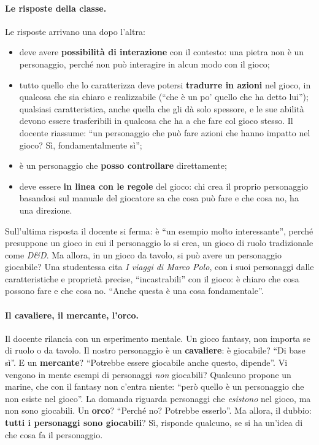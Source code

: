 \paragraph{Le risposte della classe.} Le risposte arrivano una dopo l'altra:
\begin{itemize}
  \item deve avere \textbf{possibilità di interazione} con il contesto: una pietra
        non è un personaggio, perché non può interagire in alcun modo con il
        gioco;
  \item tutto quello che lo caratterizza deve potersi \textbf{tradurre in azioni}
        nel gioco, in qualcosa che sia chiaro e realizzabile (``che è un po' quello
        che ha detto lui''); qualsiasi caratteristica, anche quella che gli dà
        solo spessore, e le sue abilità devono essere trasferibili in qualcosa che
        ha a che fare col gioco stesso. Il docente riassume: ``un personaggio che
        può fare azioni che hanno impatto nel gioco? Sì, fondamentalmente sì'';
  \item è un personaggio che \textbf{posso controllare} direttamente;
  \item deve essere \textbf{in linea con le regole} del gioco: chi crea il proprio
        personaggio basandosi sul manuale del giocatore sa che cosa può fare e che
        cosa no, ha una direzione.
\end{itemize}
Sull'ultima risposta il docente si ferma: è ``un esempio molto interessante'',
perché presuppone un gioco in cui il personaggio lo si crea, un gioco di ruolo
tradizionale come \emph{D\&D}. Ma allora, in un gioco da tavolo, si può avere un
personaggio giocabile? Una studentessa cita \emph{I viaggi di Marco Polo}, con i
suoi personaggi dalle caratteristiche e proprietà precise, ``incastrabili'' con il
gioco: è chiaro che cosa possono fare e che cosa no. ``Anche questa è una cosa
fondamentale''.

\paragraph{Il cavaliere, il mercante, l'orco.} Il docente rilancia con un
esperimento mentale. Un gioco fantasy, non importa se di ruolo o da tavolo. Il
nostro personaggio è un \textbf{cavaliere}: è giocabile? ``Di base sì''. E un
\textbf{mercante}? ``Potrebbe essere giocabile anche questo, dipende''. Vi vengono
in mente esempi di personaggi \emph{non} giocabili? Qualcuno propone un marine,
che con il fantasy non c'entra niente: ``però quello è un personaggio che non esiste
nel gioco''. La domanda riguarda personaggi che \emph{esistono} nel gioco, ma non
sono giocabili. Un \textbf{orco}? ``Perché no? Potrebbe esserlo''. Ma allora, il
dubbio: \textbf{tutti i personaggi sono giocabili}? Sì, risponde qualcuno, se si ha
un'idea di che cosa fa il personaggio.

